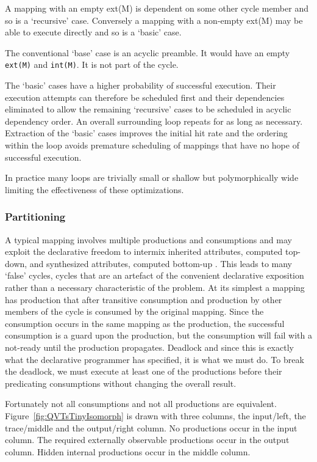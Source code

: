 \documentclass{jot}
\begin{document}
A mapping with an empty ext(M) is dependent on some other cycle member and so is a `recursive' case. Conversely a mapping with a non-empty ext(M) may be able to execute directly and so is a `basic' case.

The conventional `base' case is an acyclic preamble. It would have an empty \verb|ext(M)| and \verb|int(M)|. It is not part of the cycle.

The `basic' cases have a higher probability of successful execution. Their execution attempts can therefore be scheduled first and their dependencies eliminated to allow the remaining `recursive' cases to be scheduled in acyclic dependency order. An overall surrounding loop repeats for as long as necessary. Extraction of the `basic' cases improves the initial hit rate and the ordering within the loop avoids premature scheduling of mappings that have no hope of successful execution.

In practice many loops are trivially small or shallow but polymorphically wide limiting the effectiveness of these optimizations.

\subsubsection{Partitioning}\label{Partitioning}

A typical mapping involves multiple productions and consumptions and may exploit the declarative freedom to intermix inherited attributes, computed top-down, and synthesized attributes, computed bottom-up \cite{Aho+Sethi+Ullman/86/Compilers}. This leads to many `false' cycles, cycles that are an artefact of the convenient declarative exposition rather than a necessary characteristic of the problem. At its simplest a mapping has production that after transitive consumption and production by other members of the cycle is consumed by the original mapping. Since the consumption occurs in the same mapping as the production, the successful consumption is a guard upon the production, but the consumption will fail with a not-ready until the production propagates. Deadlock and since this is exactly what the declarative programmer has specified, it is what we must do. To break the deadlock, we must execute at least one of the productions before their predicating consumptions without changing the overall result.

Fortunately not all consumptions and not all productions are equivalent. Figure~\ref{fig:QVTsTinyIsomorph} is drawn with three columns, the input/left, the trace/middle and the output/right column. No productions occur in the input column. The required externally observable productions occur in the output column. Hidden internal productions occur in the middle column.
\end{document}
